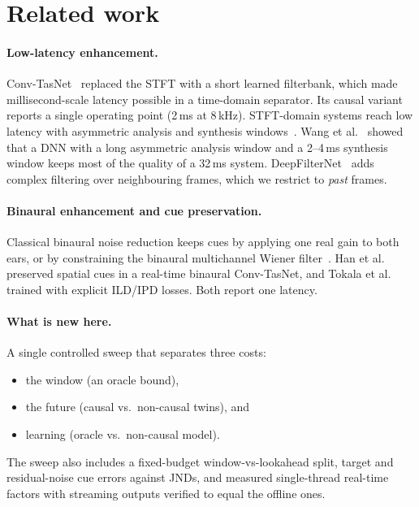 \section{Related work}
\paragraph{Low-latency enhancement.}
Conv-TasNet~\cite{luo2019convtasnet} replaced the STFT with a short learned
filterbank, which made millisecond-scale latency possible in a time-domain
separator. Its causal variant reports a single operating point (2\,ms at
8\,kHz). STFT-domain systems reach low latency with asymmetric analysis and
synthesis windows~\cite{mauler2007lowdelay}. Wang et al.~\cite{wang2023lowlatency}
showed that a DNN with a long asymmetric analysis window and a 2--4\,ms
synthesis window keeps most of the quality of a 32\,ms system.
DeepFilterNet~\cite{schroeter2022deepfilternet} adds complex filtering over
neighbouring frames, which we restrict to \emph{past} frames.

\paragraph{Binaural enhancement and cue preservation.}
Classical binaural noise reduction keeps cues by applying one real gain to
both ears, or by constraining the binaural multichannel Wiener
filter~\cite{doclo2015assisted}. Han et al.~\cite{han2020binaural}
preserved spatial cues in a real-time binaural Conv-TasNet, and Tokala et
al.~\cite{tokala2024binaural} trained with explicit ILD/IPD losses. Both
report one latency.

\paragraph{What is new here.}
A single controlled sweep that separates three costs:
\begin{itemize}
\item the window (an oracle bound),
\item the future (causal vs.\ non-causal twins), and
\item learning (oracle vs.\ non-causal model).
\end{itemize}
The sweep also includes a fixed-budget window-vs-lookahead split, target
and residual-noise cue errors against JNDs, and measured single-thread
real-time factors with streaming outputs verified to equal the offline
ones.
